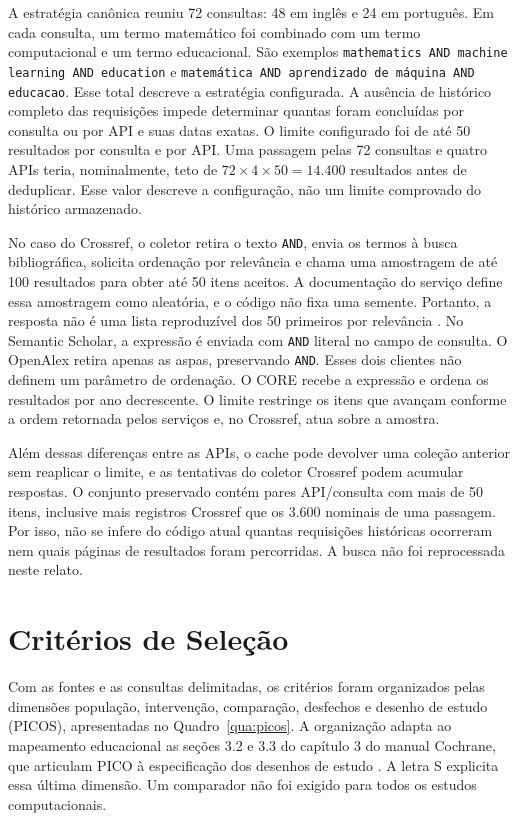 A estratégia canônica reuniu 72 consultas: 48 em inglês e 24 em português. Em cada consulta, um termo matemático foi combinado com um termo computacional e um termo educacional. São exemplos \texttt{mathematics AND machine learning AND education} e \texttt{matemática AND aprendizado de máquina AND educacao}. Esse total descreve a estratégia configurada. A ausência de histórico completo das requisições impede determinar quantas foram concluídas por consulta ou por API e suas datas exatas. O limite configurado foi de até 50 resultados por consulta e por API. Uma passagem pelas 72 consultas e quatro APIs teria, nominalmente, teto de $72\times4\times50=14.400$ resultados antes de deduplicar. Esse valor descreve a configuração, não um limite comprovado do histórico armazenado.

No caso do Crossref, o coletor retira o texto \texttt{AND}, envia os termos à busca bibliográfica, solicita ordenação por relevância e chama uma amostragem de até 100 resultados para obter até 50 itens aceitos. A documentação do serviço define essa amostragem como aleatória, e o código não fixa uma semente. Portanto, a resposta não é uma lista reproduzível dos 50 primeiros por relevância \cite{CrossrefTips2025}. No Semantic Scholar, a expressão é enviada com \texttt{AND} literal no campo de consulta. O OpenAlex retira apenas as aspas, preservando \texttt{AND}. Esses dois clientes não definem um parâmetro de ordenação. O CORE recebe a expressão e ordena os resultados por ano decrescente. O limite restringe os itens que avançam conforme a ordem retornada pelos serviços e, no Crossref, atua sobre a amostra.

Além dessas diferenças entre as APIs, o cache pode devolver uma coleção anterior sem reaplicar o limite, e as tentativas do coletor Crossref podem acumular respostas. O conjunto preservado contém pares API/consulta com mais de 50 itens, inclusive mais registros Crossref que os 3.600 nominais de uma passagem. Por isso, não se infere do código atual quantas requisições históricas ocorreram nem quais páginas de resultados foram percorridas. A busca não foi reprocessada neste relato.

\section{Critérios de Seleção}

Com as fontes e as consultas delimitadas, os critérios foram organizados pelas dimensões população, intervenção, comparação, desfechos e desenho de estudo (PICOS), apresentadas no Quadro~\ref{qua:picos}. A organização adapta ao mapeamento educacional as seções 3.2 e 3.3 do capítulo 3 do manual Cochrane, que articulam PICO à especificação dos desenhos de estudo \cite{CochraneChapter3}. A letra S explicita essa última dimensão. Um comparador não foi exigido para todos os estudos computacionais.

